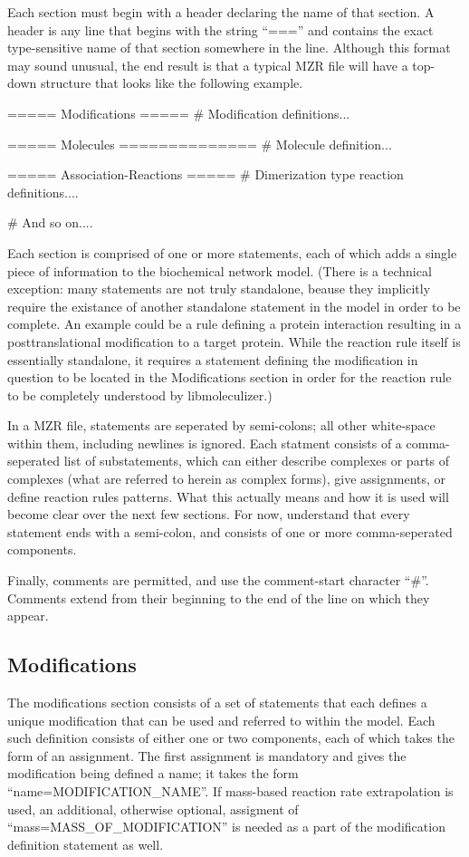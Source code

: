 Each section must begin with a header declaring the name of that
section.  A header is any line that begins with the string ``==='' and
contains the exact type-sensitive name of that section somewhere in
the line.  Although this format may sound unusual, the end result is
that a typical MZR file will have a top-down structure that looks like
the following example.

\begin{ExampleMZR}[title={the caption}, caption={a caption}]
===== Modifications =====
  # Modification definitions...

===== Molecules ==============
  # Molecule definition...

=====  Association-Reactions =====
  # Dimerization type reaction definitions....

# And so on....
\end{ExampleMZR}
 
Each section is comprised of one or more statements, each of which
adds a single piece of information to the biochemical network
model. (There is a technical exception: many statements are not truly
standalone, beause they implicitly require the existance of another
standalone statement in the model in order to be complete.  An example
could be a rule defining a protein interaction resulting in a
posttranslational modification to a target protein.  While the
reaction rule itself is essentially standalone, it requires a
statement defining the modification in question to be located in the
Modifications section in order for the reaction rule to be completely
understood by libmoleculizer.)

In a MZR file, statements are seperated by semi-colons; all other
white-space within them, including newlines is ignored.  Each statment
consists of a comma-seperated list of substatements, which can either
describe complexes or parts of complexes (what are referred to herein
as complex forms), give assignments, or define reaction rules
patterns.  What this actually means and how it is used will
become clear over the next few sections.  For now, understand that
every statement ends with a semi-colon, and consists of one or more
comma-seperated components.

Finally, comments are permitted, and use the comment-start character
``\#''.  Comments extend from their beginning to the end of the line on
which they appear.

\subsection{Modifications}
The modifications section consists of a set of statements that each
defines a unique modification that can be used and referred to within
the model.  Each such definition consists of either one or two
components, each of which takes the form of an assignment.  The first
assignment is mandatory and gives the modification being defined a
name; it takes the form ``name=MODIFICATION\_NAME''.  If mass-based
reaction rate extrapolation is used, an additional, otherwise
optional, assigment of ``mass=MASS\_OF\_MODIFICATION'' is needed as a
part of the modification definition statement as well.

